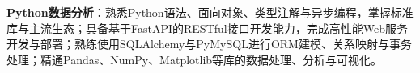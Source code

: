 \item \textbf{Python数据分析}：熟悉Python语法、面向对象、类型注解与异步编程，掌握标准库与主流生态；具备基于FastAPI的RESTful接口开发能力，完成高性能Web服务开发与部署；熟练使用SQLAlchemy与PyMySQL进行ORM建模、关系映射与事务处理；精通Pandas、NumPy、Matplotlib等库的数据处理、分析与可视化。